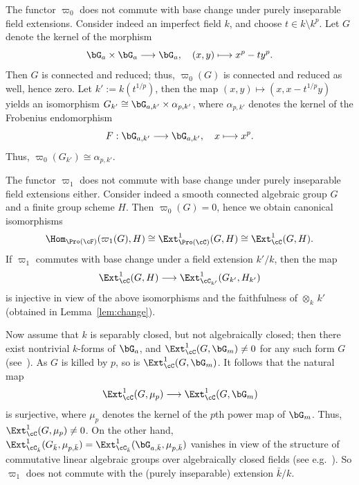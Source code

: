 \begin{rema}\label{3.19.1}
The functor $\varpi_0$ does not commute with base change under purely inseparable field extensions. Consider indeed an imperfect field $k$, and choose $t \in k \setminus k^p$. Let $G$ denote the kernel of the morphism
\[
\bG_a \times \bG_a \longrightarrow \bG_a,
\quad (x,y) \longmapsto x^p - t y^p.
\]
Then $G$ is connected and reduced; thus, $\varpi_0(G)$ is connected and reduced as well, hence zero. Let $k' := k(t^{1/p})$, then the map $(x,y) \mapsto (x, x - t^{1/p} y)$ yields an isomorphism $G_{k'} \cong \bG_{a,k'} \times \alpha_{p,k'}$, where $\alpha_{p,k'}$ denotes the kernel of the Frobenius endomorphism
\[
F : \bG_{a,k'} \longrightarrow \bG_{a,k'}, \quad x \longmapsto x^p.
\]
Thus, $\varpi_0(G_{k'}) \cong \alpha_{p,k'}$.
\end{rema}

\begin{rema}\label{3.19.2}
The functor $\varpi_1$ does not commute with base change under purely inseparable field extensions either. Consider indeed a smooth connected algebraic group $G$ and a finite group scheme $H$. Then $\varpi_0(G) = 0$, hence we obtain canonical isomorphisms
\[
\Hom_{\Pro(\cF)}(\varpi_1(G),H)
\cong \Ext^1_{\Pro(\cC)}(G,H)
\cong \Ext^1_{\cC}(G,H).
\]
If $\varpi_1$ commutes with base change under a field extension $k'/k$, then the map
\[
\Ext^1_{\cC}(G,H) \longrightarrow
\Ext^1_{\cC_{k'}}(G_{k'},H_{k'})
\]
is injective in view of the above isomorphisms and the faithfulness of $\otimes_k \, k'$ (obtained in Lemma~\ref{lem:change}).

Now assume that $k$ is separably closed, but not algebraically closed; then there exist nontrivial $k$-forms of $\bG_a$, and $\Ext^1_{\cC}(G,\bG_m) \neq 0$ for any such form $G$ (see~\cite[Lem.~9.4]{Totaro}). As $G$ is killed by $p$, so is $\Ext^1_{\cC}(G,\bG_m)$. It follows that the natural map
\[
\Ext^1_{\cC}(G,\mu_p) \longrightarrow
\Ext^1_{\cC}(G,\bG_m)
\]
is surjective, where $\mu_p$ denotes the kernel of the $p$th power map of $\bG_m$. Thus, $\Ext^1_{\cC}(G,\mu_p) \neq 0$. On the other hand, $\Ext^1_{\cC_{\bar{k}}}(G_{\bar{k}}, \mu_{p,\bar{k}}) = \Ext^1_{\cC_{\bar{k}}}(\bG_{a,\bar{k}}, \mu_{p,\bar{k}})$ vanishes in view of the structure of commutative linear algebraic groups over algebraically closed fields (see e.g.~\cite[IV.3.1.1]{DG}). So $\varpi_1$ does not commute with the (purely inseparable) extension $\bar{k}/k$.
\end{rema}

